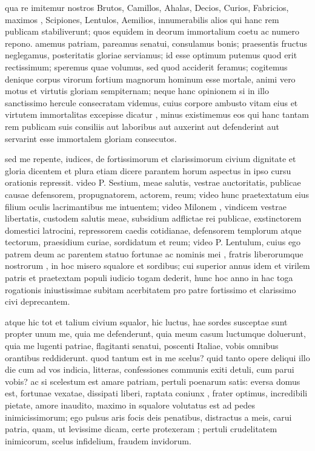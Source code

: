 qua re imitemur nostros Brutos, Camillos, Ahalas, Decios, Curios, Fabricios, maximos , Scipiones, Lentulos, Aemilios, innumerabilis alios qui hanc rem publicam stabiliverunt; quos equidem in deorum immortalium coetu ac numero repono. amemus patriam, pareamus senatui, consulamus bonis; praesentis fructus neglegamus, posteritatis gloriae serviamus; id esse optimum putemus quod erit rectissimum; speremus quae volumus, sed quod acciderit feramus; cogitemus denique corpus virorum fortium magnorum hominum esse mortale, animi vero motus et virtutis gloriam sempiternam; neque hanc opinionem si in illo sanctissimo hercule consecratam videmus, cuius corpore ambusto vitam eius et virtutem immortalitas excepisse dicatur , minus existimemus eos qui hanc tantam rem publicam suis consiliis aut laboribus aut auxerint aut defenderint aut servarint esse immortalem gloriam consecutos.

 sed me repente, iudices, de fortissimorum et clarissimorum civium dignitate et gloria dicentem et plura etiam dicere parantem horum aspectus in ipso cursu orationis repressit. video P. Sestium, meae salutis, vestrae auctoritatis, publicae causae defensorem, propugnatorem, actorem, reum; video hunc praetextatum eius filium oculis lacrimantibus me intuentem; video Milonem , vindicem vestrae libertatis, custodem salutis meae, subsidium adflictae rei publicae, exstinctorem domestici latrocini, repressorem caedis cotidianae, defensorem templorum atque tectorum, praesidium curiae, sordidatum et reum; video P. Lentulum, cuius ego patrem deum ac parentem statuo fortunae ac nominis mei , fratris liberorumque nostrorum , in hoc misero squalore et sordibus; cui superior annus idem et virilem patris et praetextam populi iudicio togam dederit, hunc hoc anno in hac toga rogationis iniustissimae subitam acerbitatem pro patre fortissimo et clarissimo civi deprecantem.

 atque hic tot et talium civium squalor, hic luctus, hae sordes susceptae sunt propter unum me, quia me defenderunt, quia meum casum luctumque doluerunt, quia me lugenti patriae, flagitanti senatui, poscenti Italiae, vobis omnibus orantibus reddiderunt. quod tantum est in me scelus? quid tanto opere deliqui illo die cum ad vos indicia, litteras, confessiones communis exiti detuli, cum parui vobis? ac si scelestum est amare patriam, pertuli poenarum satis: eversa domus est, fortunae vexatae, dissipati liberi, raptata coniunx , frater optimus, incredibili pietate, amore inaudito, maximo in squalore volutatus est ad pedes inimicissimorum; ego pulsus aris focis deis penatibus, distractus a meis, carui patria, quam, ut levissime dicam, certe protexeram ; pertuli crudelitatem inimicorum, scelus infidelium, fraudem invidorum.

